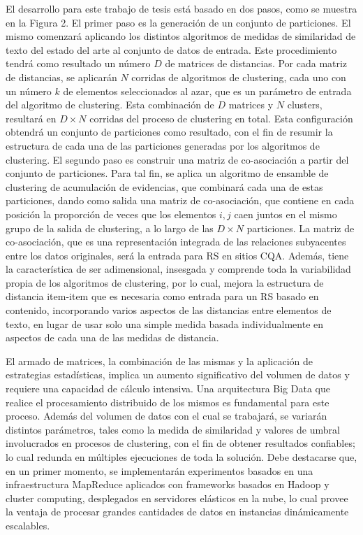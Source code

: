 \bigskip El desarrollo para este trabajo de tesis está basado en dos pasos, como se muestra en la Figura 2. El primer paso es la generación de un conjunto de particiones. El mismo comenzará aplicando los distintos algoritmos de medidas de similaridad de texto del estado del arte al conjunto de datos de entrada. Este procedimiento tendrá como resultado un número $D$ de matrices de distancias. Por cada matriz de distancias, se aplicarán $N$ corridas de algoritmos de clustering, cada uno con un número $k$ de elementos seleccionados al azar, que es un parámetro de entrada del algoritmo de clustering. Esta combinación de $D$ matrices y $N$ clusters, resultará en $D \times N$ corridas del proceso de clustering en total. Esta configuración obtendrá un conjunto de particiones como resultado, con el fin de resumir la estructura de cada una de las particiones generadas por los algoritmos de clustering. El segundo paso es construir una matriz de co-asociación a partir del conjunto de particiones. Para tal fin, se aplica un algoritmo de ensamble de clustering de acumulación de evidencias, que combinará cada una de estas particiones, dando como salida una matriz de co-asociación, que contiene en cada posición la proporción de veces que los elementos $i,j$ caen juntos en el mismo grupo de la salida de clustering, a lo largo de las $D \times N$ particiones. La matriz de co-asociación, que es una representación integrada de las relaciones subyacentes entre los datos originales, será la entrada para RS en sitios CQA. Además, tiene la característica de ser adimensional, insesgada y comprende toda la variabilidad propia de los algoritmos de clustering, por lo cual, mejora la estructura de distancia item-item que es necesaria como entrada para un RS basado en contenido, incorporando varios aspectos de las distancias entre elementos de texto, en lugar de usar solo una simple medida basada individualmente en aspectos de cada una de las medidas de distancia.

\bigskip El armado de matrices, la combinación de las mismas y la aplicación de estrategias estadísticas, implica un aumento significativo del volumen de datos y requiere una capacidad de cálculo intensiva. Una arquitectura Big Data que realice el procesamiento distribuido de los mismos es fundamental para este proceso. Además del volumen de datos con el cual se trabajará, se variarán distintos parámetros, tales como la medida de similaridad y valores de umbral involucrados en procesos de clustering, con el fin de obtener resultados confiables; lo cual redunda en múltiples ejecuciones de toda la solución. Debe destacarse que, en un primer momento, se implementarán experimentos basados en una infraestructura MapReduce aplicados con frameworks basados en Hadoop y cluster computing, desplegados en servidores elásticos en la nube, lo cual provee la ventaja de procesar grandes cantidades de datos en instancias dinámicamente escalables.
